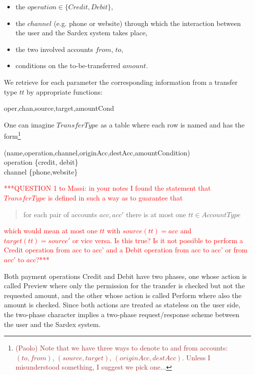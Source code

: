 \begin{itemize}
	\item the $operation \in \{Credit, Debit\}$,
	\item the $channel$ (e.g. phone or website) through which the interaction between the user and the Sardex system takes place,
	\item the two involved accounts $from$, $to$,
	\item conditions on the to-be-transferred $amount$.
\end{itemize}

We retrieve for each parameter the corresponding information from a transfer type $tt$ by appropriate functions:
\begin{asm}
oper,chan,source,target,amountCond
\end{asm}
One can imagine $TransferType$ as a table where each row is named and has the form\footnote{\textcolor{brown}{(Paolo) Note that we have three ways to denote to and from accounts: $(to, from)$, $(source, target)$, $(originAcc, destAcc)$. Unless I misunderstood something, I suggest we pick one...}}
\begin{asm}
(name,operation,channel,originAcc,destAcc,amountCondition)\\
\WHERE \+
   operation \in \{credit, debit\}\\
   channel \in \{phone,website\}
\end{asm}

\textcolor{red}{***QUESTION 1 to Massi: in your notes I found the statement that $TransferType$ is defined in such a way as to guarantee that 
\begin{quote} 
	for each pair of accounts $acc,acc'$ there is at most one $tt \in AccountType$ 
\end{quote}
which would mean at most one $tt$ with $source(tt)=acc$ and $target(tt)=source'$ or vice versa. Is this true? Is it not possible to perform a Credit operation from acc to acc' and a Debit operation from acc to acc' or from $acc'$ to $acc$?***}
\vspace{12pt}

Both payment operations Credit and Debit have two phases, one whose action is called Preview where only the permission for the transfer is checked but not the requested amount, and the other whose action is called Perform where also the amount is checked. Since both actions are treated as stateless on the user side, the two-phase character implies a two-phase request/response scheme between the user and the Sardex system.

